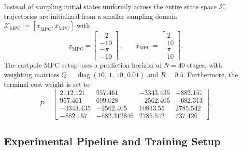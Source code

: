 Instead of sampling initial states uniformly across the entire state space $\mathcal{X}$, trajectories are 
initialized from a smaller sampling domain $\mathcal{X}_{\mathrm{MPC}} := [\underline{x}_{\mathrm{MPC}}, \overline{x}_{\mathrm{MPC}}]$ with
\begin{equation*}
    \underline{x}_{\mathrm{MPC}} = \begin{bmatrix} -2 \\ -10 \\ -\pi \\ -10 \end{bmatrix}, \qquad
    \overline{x}_{\mathrm{MPC}} = \begin{bmatrix} 2 \\ 10 \\ \pi \\ 10 \end{bmatrix}.
\end{equation*} 
The cartpole MPC setup uses a prediction horizon of $N = 40$ stages, with weighting matrices 
$Q = \operatorname{diag}(10,\, 1,\, 10,\, 0.01)$ and $R = 0.5$. Furthermore, the 
terminal cost weight  is set to 
\begin{equation*}
    P =
    \begin{bmatrix}
        2112.121 & 957.461 & -3343.435 & -882.157 \\
        957.461 & 699.028 & -2562.405 & -682.313 \\
        -3343.435 & -2562.405 & 10833.55 & 2785.542 \\
        -882.157 & -682.312846 & 2785.542 & 737.426 
    \end{bmatrix}.
\end{equation*}


\subsection{Experimental Pipeline and Training Setup}
\label{subsec:experimental-pipeline}

